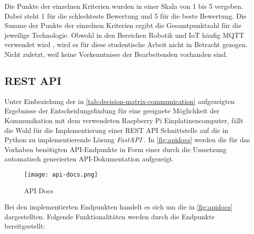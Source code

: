 Die Punkte der einzelnen Kriterien wurden in einer Skala von 1 bis 5
vergeben. Dabei steht 1 für die schlechteste Bewertung und 5 für die beste Bewertung. Die Summe der Punkte der einzelnen Kriterien ergibt die Gesamtpunktzahl für die jeweilige Technologie.
Obwohl in den Bereichen Robotik und IoT häufig MQTT verwendet wird \cite{AMARAN2015400}, wird es für diese studentische Arbeit nicht in Betracht gezogen. Nicht zuletzt, weil keine Vorkenntnisse der Bearbeitenden vorhanden sind.

\subsection{REST API}
Unter Einbeziehung der in \autoref{tab:decision-matrix-communication} aufgezeigten Ergebnisse der Entscheidungsfindung für eine geeignete Möglichkeit der Kommunikation mit dem verwendeten Raspberry Pi Einplatinencomputer, fällt die Wahl für die Implementierung einer REST API Schnittstelle auf die in Python zu implementierende Lösung \textit{FastAPI} \cite{tiangolo_fastapi_features}. In \autoref{fig:apidocs} werden die für das Vorhaben benötigten API-Endpunkte in Form einer durch die Umsetzung automatisch generierten API-Dokumentation aufgezeigt.
\begin{figure}[H]
  \centering
  \texttt{[image: api-docs.png]}
  \caption{API Docs}
  \label{fig:apidocs}
\end{figure}

Bei den implementierten Endpunkten handelt es sich um die in \autoref{fig:apidocs} dargestellten. Folgende Funktionalitäten werden durch die Endpunkte bereitgestellt:

